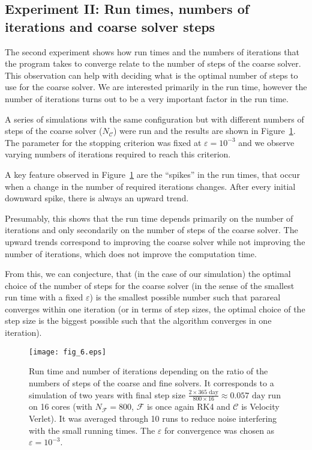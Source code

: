 \documentclass[conference]{IEEEtran}
\begin{document}
\subsection{Experiment II: Run times, numbers of iterations and coarse solver steps}

The second experiment shows how run times and the numbers of iterations that the program takes to converge relate to the number of steps of the coarse solver. This observation can help with deciding what is the optimal number of steps to use for the coarse solver. We are interested primarily in the run time, however the number of iterations turns out to be a very important factor in the run time.

A series of simulations with the same configuration but with different numbers of steps of the coarse solver ($N_\mathcal{C}$) were run and the results are shown in Figure~\ref{timetest}. The parameter for the stopping criterion was fixed at $\varepsilon = 10^{-3}$ and we observe varying numbers of iterations required to reach this criterion.

A key feature observed in Figure~\ref{timetest} are the ``spikes'' in the run times, that occur when a change in the number of required iterations changes. After every initial downward spike, there is always an upward trend. 

Presumably, this shows that the run time depends primarily on the number of iterations and only secondarily on the number of steps of the coarse solver. The upward trends correspond to improving the coarse solver while not improving the number of iterations, which does not improve the computation time.

From this, we can conjecture, that (in the case of our simulation) the optimal choice of the number of steps for the coarse solver (in the sense of the smallest run time with a fixed $\varepsilon$) is the smallest possible number such that parareal converges within one iteration (or in terms of step sizes, the optimal choice of the step size is the biggest possible such that the algorithm converges in one iteration).

\begin{figure}[htbp]
\centerline{\texttt{[image: fig\_6.eps]}}
\caption{Run time and number of iterations depending on the ratio of the numbers of steps of the coarse and fine solvers. It corresponds to a simulation of two years with final step size $\frac{2\times365\text{ day}}{800\times 16} \approx 0.057\text{ day}$ run on 16 cores (with $N_\mathcal{F} = 800$, $\mathcal{F}$ is once again RK4 and $\mathcal{C}$ is Velocity Verlet). It was averaged through 10 runs to reduce noise interfering with the small running times. The $\varepsilon$ for convergence was chosen as $\varepsilon = 10^{-3}$.}
\label{timetest}
\end{figure}
\end{document}
